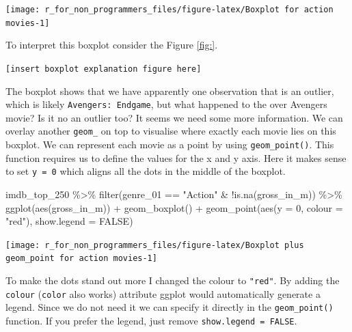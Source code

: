 \documentclass[
]{book}
\newenvironment{Shaded}{\begin{snugshade}}{\end{snugshade}}
\newcommand{\AttributeTok}[1]{\textcolor[rgb]{0.77,0.63,0.00}{#1}}
\newcommand{\ConstantTok}[1]{\textcolor[rgb]{0.00,0.00,0.00}{#1}}
\newcommand{\DecValTok}[1]{\textcolor[rgb]{0.00,0.00,0.81}{#1}}
\newcommand{\FunctionTok}[1]{\textcolor[rgb]{0.00,0.00,0.00}{#1}}
\newcommand{\NormalTok}[1]{#1}
\newcommand{\SpecialCharTok}[1]{\textcolor[rgb]{0.00,0.00,0.00}{#1}}
\newcommand{\StringTok}[1]{\textcolor[rgb]{0.31,0.60,0.02}{#1}}
\begin{document}
\begin{center}\texttt{[image: r\_for\_non\_programmers\_files/figure-latex/Boxplot for action movies-1]} \end{center}

To interpret this boxplot consider the Figure \ref{fig:}.

\texttt{{[}insert\ boxplot\ explanation\ figure\ here{]}}

The boxplot shows that we have apparently one observation that is an outlier, which is likely \texttt{Avengers:\ Endgame}, but what happened to the over Avengers movie? Is it no an outlier too? It seems we need some more information. We can overlay another \texttt{geom\_} on top to visualise where exactly each movie lies on this boxplot. We can represent each movie as a point by using \texttt{geom\_point()}. This function requires us to define the values for the x and y axis. Here it makes sense to set \texttt{y\ =\ 0} which aligns all the dots in the middle of the boxplot.

\begin{Shaded}
\begin{Highlighting}[]
\NormalTok{imdb\_top\_250 }\SpecialCharTok{\%\textgreater{}\%} 
  \FunctionTok{filter}\NormalTok{(genre\_01 }\SpecialCharTok{==} \StringTok{"Action"} \SpecialCharTok{\&} \SpecialCharTok{!}\FunctionTok{is.na}\NormalTok{(gross\_in\_m)) }\SpecialCharTok{\%\textgreater{}\%}
  \FunctionTok{ggplot}\NormalTok{(}\FunctionTok{aes}\NormalTok{(gross\_in\_m)) }\SpecialCharTok{+} 
  \FunctionTok{geom\_boxplot}\NormalTok{() }\SpecialCharTok{+}
  \FunctionTok{geom\_point}\NormalTok{(}\FunctionTok{aes}\NormalTok{(}\AttributeTok{y =} \DecValTok{0}\NormalTok{, }\AttributeTok{colour =} \StringTok{"red"}\NormalTok{), }\AttributeTok{show.legend =} \ConstantTok{FALSE}\NormalTok{)}
\end{Highlighting}
\end{Shaded}

\begin{center}\texttt{[image: r\_for\_non\_programmers\_files/figure-latex/Boxplot plus geom\_point for action movies-1]} \end{center}

To make the dots stand out more I changed the colour to \texttt{"red"}. By adding the \texttt{colour} (\texttt{color} also works) attribute ggplot would automatically generate a legend. Since we do not need it we can specify it directly in the \texttt{geom\_point()} function. If you prefer the legend, just remove \texttt{show.legend\ =\ FALSE}.
\end{document}
